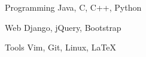 

\begin{cvskills}

  \cvskill
    {Programming} %
    {Java, C, C++, Python} %

  \cvskill
    {Web} %
    {Django, jQuery, Bootstrap} %

  \cvskill
    {Tools} %
    {Vim, Git, Linux, LaTeX} %

\end{cvskills}
